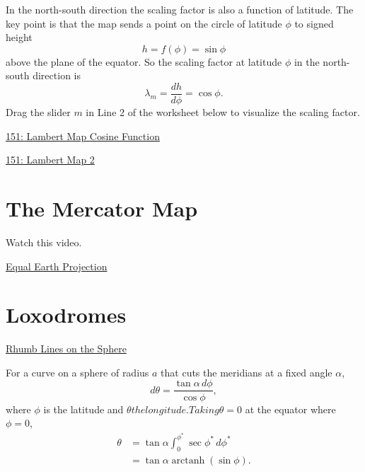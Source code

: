 \documentclass{ximera}
\begin{document}
In the north-south direction the scaling factor is also a function of latitude. The key point is that the map sends a point on the circle of latitude $\phi$ to signed height
\[
    h = f(\phi) = \sin\phi 
\]
above the plane of the equator. So the scaling factor at latitude $\phi$ in the north-south direction is
\[
 \lambda_m = \frac{dh}{d\phi} = \cos \phi.
 \]
Drag the slider $m$ in Line 2 of the worksheet below to visualize the scaling factor.

\begin{onlineOnly}
    \begin{center}
\end{center}
\end{onlineOnly}

\href{https://www.desmos.com/calculator/kbryuogdaj}{151: Lambert Map Cosine Function}


\begin{onlineOnly}
    \begin{center}
\end{center}
\end{onlineOnly}

\href{https://www.desmos.com/calculator/vwxuwjvxyy}{151: Lambert Map 2}





\section{The Mercator Map}

Watch this video.

\href{https://www.nytimes.com/2025/08/19/world/africa/africa-map-mercator.html}{Equal Earth Projection}


\section{Loxodromes}

\href{https://mathcurve.com/courbes3d.gb/loxodromie/sphereloxodromie.shtml}{Rhumb Lines on the Sphere}

For a curve on a sphere of radius $a$ that cuts the meridians at a fixed angle $\alpha$,
\[
  d\theta = \frac{\tan \alpha \, d\phi}{\cos\phi} ,
\]
where $\phi$ is the latitude and $\theta the longitude. Taking \theta = 0$ at the equator where $\phi=0$,
\begin{align*}
 \theta     &= \tan \alpha \int_0^{\phi^*} \sec \phi^* \, d\phi^*\\
               &= \tan \alpha \operatorname{arctanh}(\sin\phi) .
\end{align*}
\end{document}
